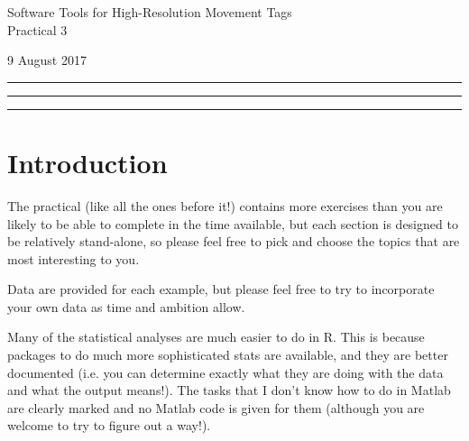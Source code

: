 \documentclass[12pt]{article}\usepackage[]{graphicx}\usepackage[]{color}
\begin{document}
\begin{center}
{\Large Software Tools for High-Resolution Movement Tags\\
Practical 3}

\bigskip

{\large 9 August 2017}
\bigskip
\rule[0cm]{12.7cm}{0.1cm} \vspace{-0.5cm} \tableofcontents
\rule[0cm]{12.7cm}{0.05cm} \vspace{-0.5cm}
\begin{center}
\rule[0cm]{7cm}{0.05cm}
\end{center}

\bigskip
\end{center}



\section{Introduction}

The practical (like all the ones before it!) contains more exercises than you are likely to be able to complete in the time available, but each section is designed to be relatively stand-alone, so please feel free to pick and choose the topics that are most interesting to you.

Data are provided for each example, but please feel free to try to incorporate your own data as time and ambition allow.

Many of the statistical analyses are much easier to do in R. This is because packages to do much more sophisticated stats are available, and they are better documented (i.e. you can determine exactly what they are doing with the data and what the output means!).  The tasks that I don't know how to do in Matlab are clearly marked and no Matlab code is given for them (although you are welcome to try to figure out a way!).
\end{document}
